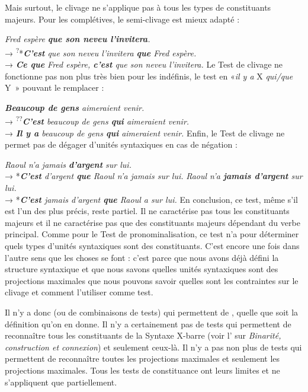 {    Mais surtout, le clivage ne s’applique pas à tous les types de constituants majeurs. Pour les complétives, le semi-clivage est mieux adapté :
    
    \ea
        \textit{{Fred espère} \textbf{{que son neveu l’invitera}}.}\\  
        \textrm{→}  \textsuperscript{?}{*}\textit{\textbf{{C’est}}  {que son neveu l’invitera} \textbf{{que}}  {Fred espère.}}\\
        \textrm{→} \textit{\textbf{{Ce que}}  {Fred espère,} \textbf{{c’est}} {que son neveu l’invitera.}}
    \z
    Le Test de clivage ne fonctionne pas non plus très bien pour les indéfinis, le test en «\textit{il y a} X \textit{qui/que} Y~» pouvant le remplacer :

    \ea
        \textit{\textbf{{Beaucoup de gens}}  {aimeraient venir.}}\\     
        \textrm{→}    \textsuperscript{??}\textit{\textbf{{C’est}}  {beaucoup de gens} \textbf{{qui}}  {aimeraient venir.}}\\
        \textrm{→}    \textit{\textbf{{Il y a}}  {beaucoup de gens} \textbf{{qui}}  {aimeraient venir.}}
    \z
    Enfin, le Test de clivage ne permet pas de dégager d’unités syntaxiques en cas de négation :

    \ea
    \ea         \textit{{Raoul n’a}  {jamais} \textbf{{d’argent}} {sur lui.}}\\ \textrm{→}  *\textit{\textbf{{C’est}} {d’argent} \textbf{{que}}  {Raoul n’a} {jamais sur lui.}}
    \ex         \textit{{Raoul n’a} \textbf{{jamais d’argent}}  {sur lui.}}\\ \textrm{→}  *\textit{\textbf{{C’est}} {jamais d’argent} \textbf{{que}}  {Raoul a sur lui.}}
    \z
    \z
    En conclusion, ce test, même s’il est l’un des plus précis, reste partiel. Il ne caractérise pas tous les constituants majeurs et il ne caractérise pas que des constituants majeurs dépendant du verbe principal. Comme pour le Test de pronominalisation, ce test n’a  pour déterminer quels types d’unités syntaxiques sont des constituants. C’est encore une fois dans l’autre sens que les choses se font : c’est parce que nous avons déjà défini la structure syntaxique et que nous savons quelles unités syntaxiques sont des projections maximales que nous pouvons savoir quelles sont les contraintes sur le clivage et comment l’utiliser comme test.

    Il n’y a donc  (ou de combinaisons de tests) qui permettent de , quelle que soit la définition qu’on en donne. Il n’y a certainement pas de tests qui permettent de reconnaître tous les constituants de la Syntaxe X-barre (voir l' sur \textit{Binarité, construction et connexion}) et seulement ceux-là. Il n’y a pas non plus de tests qui permettent de reconnaître toutes les projections maximales et seulement les projections maximales. Tous les tests de constituance ont leurs limites et ne s’appliquent que partiellement.

}
